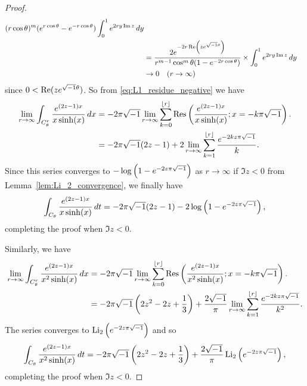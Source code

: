 \begin{proof}
\begin{equation*}
\begin{split}
       {(r\cos\theta)^m(e^{r\cos\theta}-e^{-r\cos\theta})}
  \int_{0}^{1}e^{2ry\operatorname{Im}{z}}\,dy
  \\
  &=
  \frac{2e^{-2r\operatorname{Re}\left(ze^{\sqrt{-1}\theta}\right)}}
       {r^{m-1}\cos^m\theta(1-e^{-2r\cos\theta})}
  \times
  \int_{0}^{1}e^{2ry\operatorname{Im}{z}}\,dy
  \\
  &\to0\quad(r\to\infty)
\end{split}
\end{equation*}
since $0<\operatorname{Re}(ze^{\sqrt{-1}\theta})$.
So from \eqref{eq:L1_residue_negative} we have
\begin{equation*}
\begin{split}
  \lim_{r\to\infty}
  \int_{C_{\theta}^{r}}\frac{e^{(2z-1)x}}{x\sinh(x)}\,dx
  &=
  -2\pi\sqrt{-1}
  \lim_{r\to\infty}
  \sum_{k=0}^{\lfloor{r}\rfloor}\operatorname{Res}\left(\frac{e^{(2z-1)x}}{x\sinh(x)};x=-k\pi\sqrt{-1}\right).
  \\
  &=
  -2\pi\sqrt{-1}(2z-1)
  +
  2\lim_{r\to\infty}\sum_{k=1}^{\lfloor{r}\rfloor}\frac{e^{-2kz\pi\sqrt{-1}}}{k}.
\end{split}
\end{equation*}
Since this series converges to $-\log\left(1-e^{-2z\pi\sqrt{-1}}\right)$ as $r\to\infty$ if $\Im{z}<0$ from Lemma~\ref{lem:Li_2_convergence}, we finally have
\begin{equation*}
  \int_{C_{\theta}}
  \frac{e^{(2z-1)x}}{x\sinh(x)}\,dt
  =
  -2\pi\sqrt{-1}(2z-1)-2\log\left(1-e^{-2z\pi\sqrt{-1}}\right),
\end{equation*}
completing the proof when $\Im{z}<0$.
\par
Similarly, we have
\begin{equation*}
\begin{split}
  \lim_{r\to\infty}
  \int_{C_{\theta}^{r}}\frac{e^{(2z-1)x}}{x^2\sinh(x)}\,dx
  &=
  -2\pi\sqrt{-1}
  \lim_{r\to\infty}
  \sum_{k=0}^{\lfloor{r}\rfloor}\operatorname{Res}\left(\frac{e^{(2z-1)x}}{x^2\sinh(x)};x=-k\pi\sqrt{-1}\right).
  \\
  &=
  -2\pi\sqrt{-1}\left(2z^2-2z+\frac{1}{3}\right)
  +
  \frac{2\sqrt{-1}}{\pi}\lim_{r\to\infty}\sum_{k=1}^{\lfloor{r}\rfloor}\frac{e^{-2kz\pi\sqrt{-1}}}{k^2}.
\end{split}
\end{equation*}
The series converges to $\operatorname{Li}_2\left(e^{-2z\pi\sqrt{-1}}\right)$ and so
\begin{equation*}
  \int_{C_{\theta}}
  \frac{e^{(2z-1)x}}{x^2\sinh(x)}\,dt
  =
  -2\pi\sqrt{-1}\left(2z^2-2z+\frac{1}{3}\right)+\frac{2\sqrt{-1}}{\pi}\operatorname{Li}_2\left(e^{-2z\pi\sqrt{-1}}\right),
\end{equation*}
completing the proof when $\Im{z}<0$.
\end{proof}
